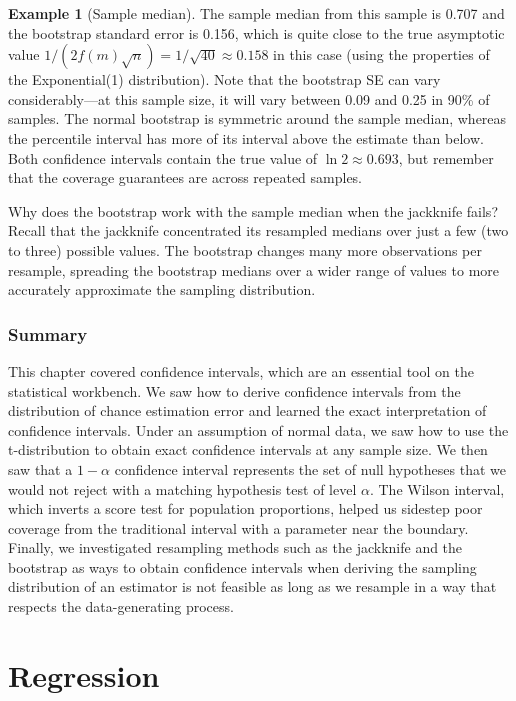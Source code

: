 \documentclass[
  13pt,
  letterpaper,
  DIV=11,
  numbers=noendperiod]{scrreprt}
\theoremstyle{plain}
\theoremstyle{plain}
\theoremstyle{definition}
\theoremstyle{definition}
\newtheorem{example}{Example}[chapter]
\theoremstyle{remark}
\begin{document}
\begin{example}[Sample
median]
The sample median from this sample is 0.707 and the bootstrap standard
error is 0.156, which is quite close to the true asymptotic value
\(1/(2f(m)\sqrt{n}) = 1/\sqrt{40}\approx 0.158\) in this case (using the
properties of the Exponential(1) distribution). Note that the bootstrap
SE can vary considerably---at this sample size, it will vary between
0.09 and 0.25 in 90\% of samples. The normal bootstrap is symmetric
around the sample median, whereas the percentile interval has more of
its interval above the estimate than below. Both confidence intervals
contain the true value of \(\ln{2} \approx 0.693\), but remember that
the coverage guarantees are across repeated samples.

Why does the bootstrap work with the sample median when the jackknife
fails? Recall that the jackknife concentrated its resampled medians over
just a few (two to three) possible values. The bootstrap changes many
more observations per resample, spreading the bootstrap medians over a
wider range of values to more accurately approximate the sampling
distribution.

\end{example}

\section{Summary}\label{summary-4}

This chapter covered confidence intervals, which are an essential tool
on the statistical workbench. We saw how to derive confidence intervals
from the distribution of chance estimation error and learned the exact
interpretation of confidence intervals. Under an assumption of normal
data, we saw how to use the t-distribution to obtain exact confidence
intervals at any sample size. We then saw that a \(1-\alpha\) confidence
interval represents the set of null hypotheses that we would not reject
with a matching hypothesis test of level \(\alpha\). The Wilson
interval, which inverts a score test for population proportions, helped
us sidestep poor coverage from the traditional interval with a parameter
near the boundary. Finally, we investigated resampling methods such as
the jackknife and the bootstrap as ways to obtain confidence intervals
when deriving the sampling distribution of an estimator is not feasible
as long as we resample in a way that respects the data-generating
process.

\part{Regression}
\end{document}
